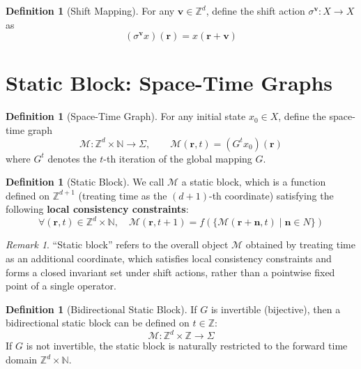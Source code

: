 \documentclass[11pt]{article}
\theoremstyle{definition}
\newtheorem{definition}[theorem]{Definition}
\theoremstyle{remark}
\newtheorem{remark}[theorem]{Remark}
\begin{document}
\begin{definition}[Shift Mapping]\label{def:shift}
For any \( \mathbf{v} \in \mathbb{Z}^d \), define the shift action \( \sigma^\mathbf{v}: X \to X \) as
\[
(\sigma^\mathbf{v} x)(\mathbf{r}) = x(\mathbf{r} + \mathbf{v})
\]
\end{definition}

\section{Static Block: Space-Time Graphs}\label{sec:static}

\begin{definition}[Space-Time Graph]\label{def:spacetime}
For any initial state \( x_0 \in X \), define the space-time graph
\[
\mathcal{M}: \mathbb{Z}^d \times \mathbb{N} \to \Sigma, \qquad \mathcal{M}(\mathbf{r}, t) = (G^t x_0)(\mathbf{r})
\]
where \( G^t \) denotes the \( t \)-th iteration of the global mapping \( G \).
\end{definition}

\begin{definition}[Static Block]\label{def:staticblock}
We call \( \mathcal{M} \) a static block, which is a function defined on \( \mathbb{Z}^{d+1} \) (treating time as the \( (d+1) \)-th coordinate) satisfying the following \textbf{local consistency constraints}:
\[
\forall (\mathbf{r}, t) \in \mathbb{Z}^d \times \mathbb{N}, \quad \mathcal{M}(\mathbf{r}, t+1) = f\left( \{ \mathcal{M}(\mathbf{r} + \mathbf{n}, t) \mid \mathbf{n} \in N \} \right)
\]
\end{definition}

\begin{remark}
``Static block'' refers to the overall object \( \mathcal{M} \) obtained by treating time as an additional coordinate, which satisfies local consistency constraints and forms a closed invariant set under shift actions, rather than a pointwise fixed point of a single operator.
\end{remark}

\begin{definition}[Bidirectional Static Block]\label{def:bidir}
If \( G \) is invertible (bijective), then a bidirectional static block can be defined on \( t \in \mathbb{Z} \):
\[
\mathcal{M}: \mathbb{Z}^d \times \mathbb{Z} \to \Sigma
\]
If \( G \) is not invertible, the static block is naturally restricted to the forward time domain \( \mathbb{Z}^d \times \mathbb{N} \).
\end{definition}
\end{document}
